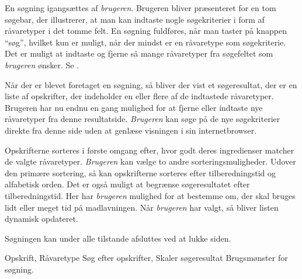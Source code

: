 {En søgning igangsættes af \textit{brugeren}. Brugeren bliver præsenteret for en tom søgebar, der illustrerer, at man kan indtaste nogle søgekriterier i form af råvaretyper i det tomme felt. En søgning fuldføres, når man taster på knappen ``søg'', hvilket kun er muligt, når der mindst er en råvaretype som søgekriterie. Det er muligt at indtaste og fjerne så mange råvaretyper fra søgefeltet som \textit{brugeren} ønsker. Se .

Når der er blevet foretaget en søgning, så bliver der vist et søgeresultat, der er en liste af opskrifter, der indeholder en eller flere af de indtastede råvaretyper. Brugeren har nu endnu en gang mulighed for at fjerne eller indtaste nye råvaretyper fra denne resultatside. \textit{Brugeren} kan søge på de nye søgekriterier direkte fra denne side uden at genlæse visningen i sin internetbrowser.

Opskrifterne sorteres i første omgang efter, hvor godt deres ingredienser matcher de valgte råvaretyper. \textit{Brugeren} kan vælge to andre sorteringsmuligheder. Udover den primære sortering, så kan opskrifterne sorteres efter tilberedningstid og alfabetisk orden. Det er også muligt at begrænse søgeresultatet efter tilberedningstid. Her har \textit{brugeren} mulighed for at bestemme om, der skal bruges lidt eller meget tid på madlavningen. Når \textit{brugeren} har valgt, så bliver listen dynamisk opdateret.

Søgningen kan under alle tilstande afsluttes ved at lukke siden.}
{Opskrift, Råvaretype}
{Søg efter opskrifter, Skaler søgeresultat}
{Brugsmønster for søgning.}
